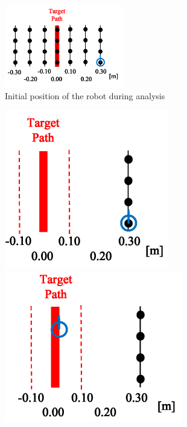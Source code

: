 \documentclass{jarticle}
\begin{document}
\begin{figure}[h!]
  \centering
   \includegraphics[height=36mm]{./figs/k.png}
   \caption{Initial position of the robot during analysis}
\end{figure}


\begin{figure}[htbp]
  \begin{minipage}[t]{0.5\linewidth}
    \centering
    \includegraphics[keepaspectratio, scale=0.32]{figs/init.png}
  \end{minipage}
  \begin{minipage}[t]{0.5\linewidth}
    \centering
    \includegraphics[keepaspectratio, scale=0.32]{figs/return.png}
  \end{minipage}\vspace*{2mm}
\vspace*{-2.5mm}

\end{figure}
\end{document}
